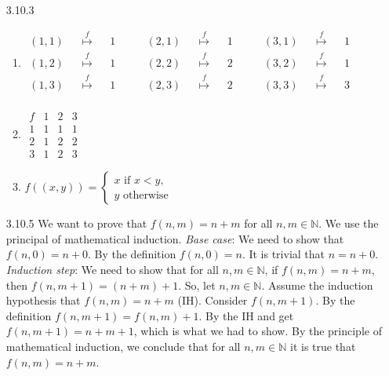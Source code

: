 \begin{itemize}
\begin{enumerate}[(a)]
\end{enumerate}
\item[3.10.3] \
\begin{enumerate}
    \item $	\begin{matrix}
		(1,1) && \overset{f}{\mapsto} && 1 \\ 
		(1,2) && \overset{f}{\mapsto} && 1 \\ 
		(1,3) && \overset{f}{\mapsto} && 1 \\
	\end{matrix} 
	\qquad	
	\begin{matrix}
		(2,1) && \overset{f}{\mapsto} && 1 \\
		(2,2) && \overset{f}{\mapsto} && 2\\
		(2,3) && \overset{f}{\mapsto} && 2\\
	\end{matrix}
	\qquad
		\begin{matrix}
 		(3,1)&& \overset{f}{\mapsto} && 1\\
		(3,2)&& \overset{f}{\mapsto} && 1\\
		(3,3) && \overset{f}{\mapsto} && 3\\
	\end{matrix}$
	\item $\begin{array}{c|ccc}
		f & 1 & 2 & 3 \\ \hline
		1 & 1& 1& 1 \\
		2 & 1 & 2 &2 \\
		3 & 1 & 2 & 3 
	\end{array}$
	\item 	$
	f((x, y)) = 
	\begin{cases}
	x \text{ if } x < y,\\
	y \text{ otherwise}
	\end{cases}
	$
\end{enumerate}{}

      \item[3.10.5] We want to prove that $f(n,m) = n + m$ for all $n, m \in \mathbb{N}$.
        We use the principal of mathematical induction.
        \emph{Base case}:
        We need to show that $f(n,0) = n + 0$.
        By the definition $f(n,0) = n$.
        It is trivial that $n = n + 0$.
        \emph{Induction step}:
        We need to show that for all $n, m \in \mathbb{N}$,
        if $f(n,m)=n+m$, then $f(n,m+1)=(n+m)+1$.
        So, let $n, m \in \mathbb{N}$.
        Assume the induction hypothesis that $f(n,m) = n + m$ (IH).
        Consider $f(n, m + 1)$.
        By the definition $f(n,m+1) = f(n,m) + 1$.
        By the IH and get $f(n,m+1) = n + m + 1$, which is what we had to show.
        By the principle of mathematical induction,
        we conclude that for all $n, m \in \mathbb{N}$ it is true that $f(n,m) = n + m$.


\end{itemize}
